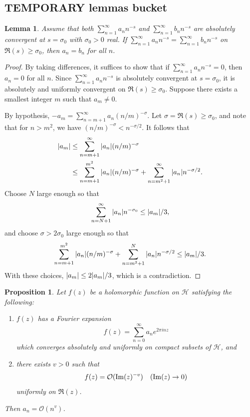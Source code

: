 \documentclass[10pt,leqno,twoside,b5paper]{article}
\theoremstyle{plain}
\newtheorem{lemma}[lem]{Lemma}
\newtheorem{proposition}[lem]{Proposition}
\theoremstyle{definition}
\numberwithin{equation}{section}
\numberwithin{lem}{section}
\begin{document}
\subsection{TEMPORARY lemmas bucket}
\begin{lemma}\label{lem: miyake lem 3.2.1}
    Assume that both $\sum_{n=1}^\infty a_nn^{-s}$ and $\sum_{n=1}^\infty b_nn^{-s}$ are absolutely convergent at $s = \sigma_0$ with $\sigma_0>0$ real. If $\sum_{n=1}^\infty a_nn^{-s} = \sum_{n=1}^\infty b_nn^{-s}$ on $\Re(s)\geq \sigma_0$, then $a_n = b_n$ for all $n$.
\end{lemma}
\begin{proof}
    By taking differences, it suffices to show that if $\sum_{n=1}^\infty a_nn^{-s} = 0$, then $a_n = 0$ for all $n$. Since $\sum_{n=1}^\infty a_nn^{-s}$ is absolutely convergent at $s = \sigma_0$, it is absolutely and uniformly convergent on $\Re(s)\geq \sigma_0$. Suppose there exists a smallest integer $m$ such that $a_m \neq 0$.
    
    By hypothesis, $-a_m = \sum_{n=m+1}^\infty a_n (n/m)^{-\sigma}$. Let $\sigma = \Re(s)\geq \sigma_0$, and note that for $n>m^2$, we have $(n/m)^{-\sigma}<n^{-\sigma/2}$. It follows that
    \begin{align*}
        \abs{a_m} &\leq \sum_{n=m+1}^\infty \abs{a_n} (n/m)^{-\sigma}\\
        &\leq \sum_{n=m+1}^{m^2} \abs{a_n} (n/m)^{-\sigma} + \sum_{n=m^2+1}^\infty \abs{a_n} n^{-\sigma/2}.
    \end{align*}
    Choose $N$ large enough so that
    \[\sum_{n=N+1}^\infty \abs{a_n}n^{-\sigma_0}\leq \abs{a_m}/3,\]
    and choose $\sigma>2\sigma_0$ large enough so that 
    \[\sum_{n=m+1}^{m^2} \abs{a_n} (n/m)^{-\sigma} + \sum_{n=m^2+1}^N \abs{a_n}n^{-\sigma/2}\leq \abs{a_m}/3.\] With these choices, $\abs{a_m}\leq 2\abs{a_m}/3$, which is a contradiction.
\end{proof}
\begin{proposition}\label{prop: miyake prop pre-lemma 4.3.3}
    Let $f(z)$ be a holomorphic function on $\mathcal H$ satisfying the following: 
    \begin{enumerate}[label = \textup{(\arabic*)}]
        \item $f(z)$ has a Fourier expansion \[f(z) = \sum_{n=0}^\infty a_ne^{2\pi i nz}\] which converges absolutely and uniformly on compact subsets of $\mathcal H$, and
        \item there exists $v>0$ such that \[f(z) = \mathcal O(\Im(z)^{-v}) \quad \textup{($\Im(z)\to 0$)}\] uniformly on $\Re(z)$. 
    \end{enumerate}
    Then $a_n = \mathcal O(n^v)$.
\end{proposition}
\end{document}
